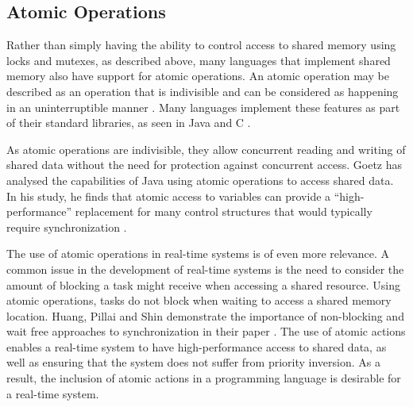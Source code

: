 \subsection{Atomic Operations} %
Rather than simply having the ability
to control access to shared memory using locks and mutexes, as described above,
many languages that implement shared memory also have support for atomic
operations. An atomic operation may be described as an operation that is
indivisible and can be considered as happening in an uninterruptible manner
\cite{preshing}. Many languages implement these features as part of their
standard libraries, as seen in Java and C \cite{java-atomic,preshing}.  
\par\bigskip\noindent
As atomic operations are indivisible, they
allow concurrent reading and writing of shared data without the need for
protection against concurrent access. Goetz has analysed the capabilities of
Java using atomic operations to access shared  data. In his study, he finds that
atomic access to variables can provide a ``high-performance'' replacement for
many control structures that would typically require synchronization
\cite{java-ibm-atomic}.  
\par\bigskip\noindent
The use of atomic operations in
real-time systems is of even more relevance.  A common issue in the development
of real-time systems is the need to consider the amount of blocking a task
might receive when accessing a shared resource. Using atomic operations, tasks 
do not block when waiting to access a shared memory location. Huang, Pillai and 
Shin demonstrate the importance of non-blocking and wait free approaches to 
synchronization in their paper \cite{Huang:2002:IWA:647057.713863}.
The use of atomic actions enables a real-time system to have high-performance
access to shared data, as well as ensuring that the system does not suffer from 
priority inversion. As a result, the inclusion of atomic actions in a programming 
language is desirable for a real-time system. 

